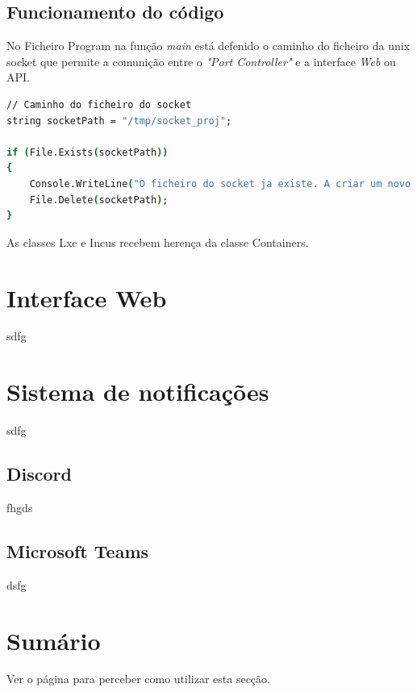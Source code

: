 \subsection{Funcionamento do código}


No Ficheiro Program na função \textit{main} está defenido o caminho do ficheiro 
da unix socket que permite a comunição entre o \textit{"Port Controller"} e 
a interface \textit{Web} ou API.


\begin{lstlisting}[language=csh, caption={teste}]
// Caminho do ficheiro do socket
string socketPath = "/tmp/socket_proj";

if (File.Exists(socketPath))
{
    Console.WriteLine("O ficheiro do socket ja existe. A criar um novo...");
    File.Delete(socketPath);
}

\end{lstlisting}




As classes Lxc e Incus recebem herença da classe Containers.


\section{Interface Web}

sdfg


\section{Sistema de notificações}

sdfg

\subsection{Discord}

fhgds

\subsection{Microsoft Teams}

dsfg

\section*{Sumário}

Ver o  página \pageref{sec:intro_summary} para perceber como utilizar esta secção.


